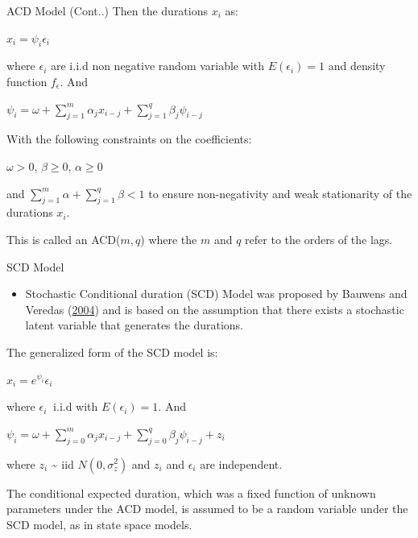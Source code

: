 \documentclass[
  ignorenonframetext,
]{beamer}
\providecommand{\tightlist}{%
  \setlength{\itemsep}{0pt}\setlength{\parskip}{0pt}}
\begin{document}
\begin{frame}{ACD Model (Cont..)}
\protect\hypertarget{acd-model-cont..}{}
Then the durations \(x_i\) as:

\(x_i = \psi_i \epsilon_i\)

where \(\epsilon_i\) are i.i.d non negative random variable with
\(E(\epsilon_i)=1\) and density function \(f_{\epsilon}\). And

\(\psi_i = \omega + \sum_{j=1}^m \alpha_j x_{i-j} + \sum_{j=1}^q \beta_j \psi_{i-j}\)

With the following constraints on the coefficients:

\(\omega > 0\), \(\beta \geq 0\), \(\alpha \geq 0\)

and \(\sum_{j=1}^m\alpha + \sum_{j=1}^q\beta < 1\) to ensure
non-negativity and weak stationarity of the durations \(x_i\).

This is called an ACD(\(m, q\)) where the \(m\) and \(q\) refer to the
orders of the lags.
\end{frame}

\begin{frame}{SCD Model}
\protect\hypertarget{scd-model}{}
\begin{itemize}
\tightlist
\item
  Stochastic Conditional duration (SCD) Model was proposed by Bauwens
  and Veredas (\protect\hyperlink{ref-SCD}{2004}) and is based on the
  assumption that there exists a stochastic latent variable that
  generates the durations.
\end{itemize}

The generalized form of the SCD model is:

\(x_i = e^{\psi_i} \epsilon_i\)

where \(\epsilon_i ~\) i.i.d with \(E(\epsilon_i)=1\). And

\(\psi_i = \omega + \sum_{j=0}^m \alpha_j x_{i-j} + \sum_{j=0}^q \beta_j \psi_{i-j} + z_i\)

where \(z_i\) \textasciitilde{} iid \(N(0,\sigma_z^2)\) and \(z_i\) and
\(\epsilon_i\) are independent.

The conditional expected duration, which was a fixed function of unknown
parameters under the ACD model, is assumed to be a random variable under
the SCD model, as in state space models.
\end{frame}
\end{document}
